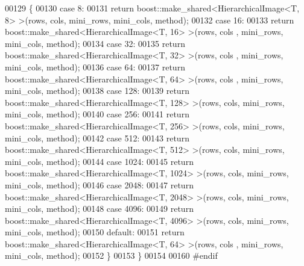 \begin{DoxyCode}
00129         \{
00130         \textcolor{keywordflow}{case} 8:
00131                 \textcolor{keywordflow}{return} boost::make\_shared<HierarchicalImage<T, 8> >(rows, cols,
       mini\_rows, mini\_cols, method);
00132         \textcolor{keywordflow}{case} 16:
00133                 \textcolor{keywordflow}{return} boost::make\_shared<HierarchicalImage<T, 16> >(rows, cols
      , mini\_rows, mini\_cols, method);
00134         \textcolor{keywordflow}{case} 32:
00135                 \textcolor{keywordflow}{return} boost::make\_shared<HierarchicalImage<T, 32> >(rows, cols
      , mini\_rows, mini\_cols, method);
00136         \textcolor{keywordflow}{case} 64:
00137                 \textcolor{keywordflow}{return} boost::make\_shared<HierarchicalImage<T, 64> >(rows, cols
      , mini\_rows, mini\_cols, method);
00138         \textcolor{keywordflow}{case} 128:
00139                 \textcolor{keywordflow}{return} boost::make\_shared<HierarchicalImage<T, 128> >(rows, 
      cols, mini\_rows, mini\_cols, method);
00140         \textcolor{keywordflow}{case} 256:
00141                 \textcolor{keywordflow}{return} boost::make\_shared<HierarchicalImage<T, 256> >(rows, 
      cols, mini\_rows, mini\_cols, method);
00142         \textcolor{keywordflow}{case} 512:
00143                 \textcolor{keywordflow}{return} boost::make\_shared<HierarchicalImage<T, 512> >(rows, 
      cols, mini\_rows, mini\_cols, method);
00144         \textcolor{keywordflow}{case} 1024:
00145                 \textcolor{keywordflow}{return} boost::make\_shared<HierarchicalImage<T, 1024> >(rows, 
      cols, mini\_rows, mini\_cols, method);
00146         \textcolor{keywordflow}{case} 2048:
00147                 \textcolor{keywordflow}{return} boost::make\_shared<HierarchicalImage<T, 2048> >(rows, 
      cols, mini\_rows, mini\_cols, method);
00148         \textcolor{keywordflow}{case} 4096:
00149                 \textcolor{keywordflow}{return} boost::make\_shared<HierarchicalImage<T, 4096> >(rows, 
      cols, mini\_rows, mini\_cols, method);
00150         \textcolor{keywordflow}{default}:
00151                 \textcolor{keywordflow}{return} boost::make\_shared<HierarchicalImage<T, 64> >(rows, cols
      , mini\_rows, mini\_cols, method);
00152         \}
00153 \}
00154 
00160 \textcolor{preprocessor}{#endif}
\end{DoxyCode}

